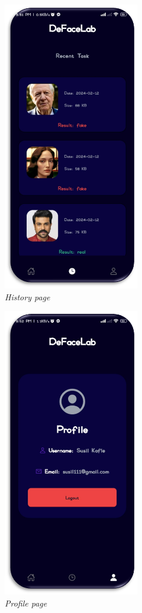 \begin{figure}[ht]
    \centering
    \includegraphics[height= 5in]{img/Historyv2.png}
    \caption{\textit{History page}}
\end{figure}


\begin{figure}[ht]
    \centering
    \includegraphics[height= 5in]{img/profilev2.png}
    \caption{\textit{Profile page}}
\end{figure}